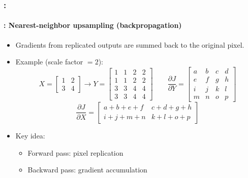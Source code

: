 \documentclass[xcolor=table]{beamer}
\begin{document}
\begin{frame}
	\frametitle{\insertshortsubtitle: \insertsection}
	\framesubtitle{\insertsubsection: Nearest-neighbor upsampling (backpropagation)}
	
	\begin{itemize}
		\item Gradients from replicated outputs are summed back to the original pixel.
		
		\item Example (scale factor $=2$):
		\[
		X =
		\begin{bmatrix}
			1 & 2 \\
			3 & 4
		\end{bmatrix}
		\rightarrow
		Y =
		\begin{bmatrix}
			1 & 1 & 2 & 2 \\
			1 & 1 & 2 & 2 \\
			3 & 3 & 4 & 4 \\
			3 & 3 & 4 & 4
		\end{bmatrix}
		\quad\quad
		\frac{\partial J}{\partial Y} =
		\begin{bmatrix}
			a & b & c & d \\
			e & f & g & h \\
			i & j & k & l \\
			m & n & o & p
		\end{bmatrix}
		\]
		\[
		\frac{\partial J}{\partial X} =
		\begin{bmatrix}
			a+b+e+f & c+d+g+h \\
			i+j+m+n & k+l+o+p
		\end{bmatrix}
		\]
		
		\item Key idea:
		\begin{itemize}
			\item Forward pass: pixel replication
			\item Backward pass: gradient accumulation
		\end{itemize}
		
	\end{itemize}
	
\end{frame}
\end{document}
